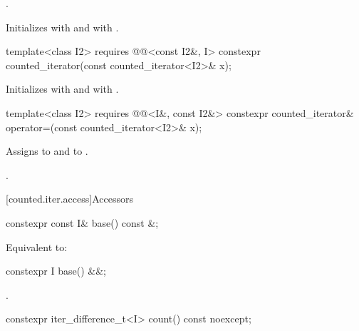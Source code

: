 \begin{itemdescr}
\pnum
\expects
{}.

\pnum
\effects
Initializes  with  and
 with .
\end{itemdescr}

%
\begin{itemdecl}
template<class I2>
  requires @@<const I2&, I>
    constexpr counted_iterator(const counted_iterator<I2>& x);
\end{itemdecl}

\begin{itemdescr}
\pnum
\effects
Initializes  with  and
 with .
\end{itemdescr}

%
\begin{itemdecl}
template<class I2>
  requires @@<I&, const I2&>
    constexpr counted_iterator& operator=(const counted_iterator<I2>& x);
\end{itemdecl}

\begin{itemdescr}
\pnum
\effects
Assigns  to  and
 to .

\pnum
\returns
{}.
\end{itemdescr}

[counted.iter.access]{Accessors}

%
\begin{itemdecl}
constexpr const I& base() const &;
\end{itemdecl}

\begin{itemdescr}
\pnum
\effects
Equivalent to: 
\end{itemdescr}

%
\begin{itemdecl}
constexpr I base() &&;
\end{itemdecl}

\begin{itemdescr}
\pnum
\returns
{}.
\end{itemdescr}

%
\begin{itemdecl}
constexpr iter_difference_t<I> count() const noexcept;
\end{itemdecl}

